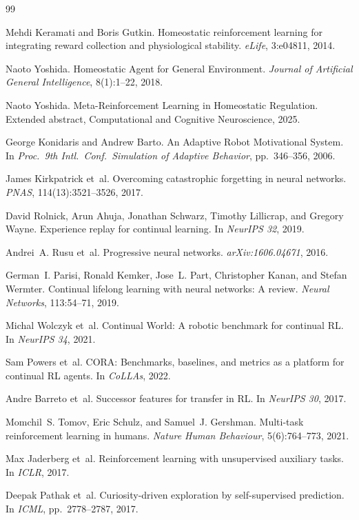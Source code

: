 \documentclass[sigplan,10pt]{acmart}
\begin{document}

\begin{thebibliography}{99}

Mehdi Keramati and Boris Gutkin.
Homeostatic reinforcement learning for integrating reward collection
  and physiological stability.
\emph{eLife}, 3:e04811, 2014.

Naoto Yoshida.
Homeostatic Agent for General Environment.
\emph{Journal of Artificial General Intelligence}, 8(1):1--22, 2018.

Naoto Yoshida.
Meta-Reinforcement Learning in Homeostatic Regulation.
Extended abstract, Computational and Cognitive Neuroscience, 2025.

George Konidaris and Andrew Barto.
An Adaptive Robot Motivational System.
In \emph{Proc.\ 9th Intl.\ Conf.\ Simulation of Adaptive Behavior},
  pp.\ 346--356, 2006.

James Kirkpatrick et~al.
Overcoming catastrophic forgetting in neural networks.
\emph{PNAS}, 114(13):3521--3526, 2017.

David Rolnick, Arun Ahuja, Jonathan Schwarz, Timothy Lillicrap, and
  Gregory Wayne.
Experience replay for continual learning.
In \emph{NeurIPS 32}, 2019.

Andrei~A. Rusu et~al.
Progressive neural networks.
\emph{arXiv:1606.04671}, 2016.

German~I. Parisi, Ronald Kemker, Jose~L. Part, Christopher Kanan, and
  Stefan Wermter.
Continual lifelong learning with neural networks: A review.
\emph{Neural Networks}, 113:54--71, 2019.

Michal Wolczyk et~al.
Continual World: A robotic benchmark for continual RL.
In \emph{NeurIPS 34}, 2021.

Sam Powers et~al.
CORA: Benchmarks, baselines, and metrics as a platform for continual
  RL agents.
In \emph{CoLLAs}, 2022.

Andre Barreto et~al.
Successor features for transfer in RL.
In \emph{NeurIPS 30}, 2017.

Momchil~S. Tomov, Eric Schulz, and Samuel~J. Gershman.
Multi-task reinforcement learning in humans.
\emph{Nature Human Behaviour}, 5(6):764--773, 2021.

Max Jaderberg et~al.
Reinforcement learning with unsupervised auxiliary tasks.
In \emph{ICLR}, 2017.

Deepak Pathak et~al.
Curiosity-driven exploration by self-supervised prediction.
In \emph{ICML}, pp.\ 2778--2787, 2017.

\end{thebibliography}
\end{document}
